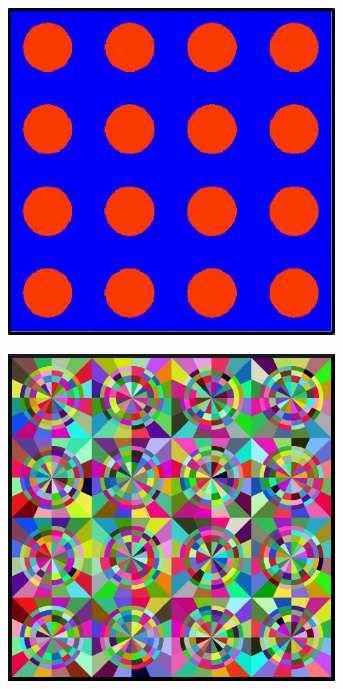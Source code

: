 \begin{figure}[ht!]
  \begin{subfigure}[htb!]{0.32\textwidth}
    \centering
    \includegraphics[width=0.95\textwidth]{figures/workflow/openmoc/materials-border}
    \label{fig:moc-model-materials}
    \caption{}
  \end{subfigure}
  \begin{subfigure}[htb!]{0.32\textwidth}
    \centering
    \includegraphics[width=0.95\textwidth]{figures/workflow/openmoc/FSRs}

\end{subfigure}
\end{figure}
